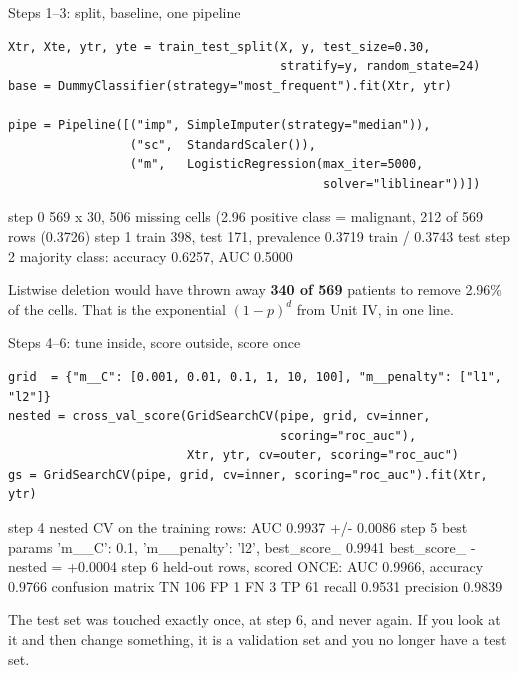 \documentclass[aspectratio=169]{beamer}
\begin{document}
\begin{frame}[fragile,shrink=4]{Steps 1--3: split, baseline, one pipeline}
\begin{lstlisting}
Xtr, Xte, ytr, yte = train_test_split(X, y, test_size=0.30,
                                      stratify=y, random_state=24)
base = DummyClassifier(strategy="most_frequent").fit(Xtr, ytr)

pipe = Pipeline([("imp", SimpleImputer(strategy="median")),
                 ("sc",  StandardScaler()),
                 ("m",   LogisticRegression(max_iter=5000,
                                            solver="liblinear"))])
\end{lstlisting}
\begin{outblk}
step 0  569 x 30, 506 missing cells (2.96%
        positive class = malignant, 212 of 569 rows (0.3726)
step 1  train 398, test 171, prevalence 0.3719 train / 0.3743 test
step 2  majority class: accuracy 0.6257, AUC 0.5000
\end{outblk}
  \begin{center}
    \small Listwise deletion would have thrown away \textbf{340 of 569}
    patients to remove 2.96\% of the cells. That is the exponential
    $(1-p)^d$ from Unit IV, in one line.
  \end{center}
\end{frame}

\begin{frame}[fragile,shrink=4]{Steps 4--6: tune inside, score outside, score once}
\begin{lstlisting}
grid  = {"m__C": [0.001, 0.01, 0.1, 1, 10, 100], "m__penalty": ["l1", "l2"]}
nested = cross_val_score(GridSearchCV(pipe, grid, cv=inner,
                                      scoring="roc_auc"),
                         Xtr, ytr, cv=outer, scoring="roc_auc")
gs = GridSearchCV(pipe, grid, cv=inner, scoring="roc_auc").fit(Xtr, ytr)
\end{lstlisting}
\begin{outblk}
step 4  nested CV on the training rows: AUC 0.9937 +/- 0.0086
step 5  best params {'m__C': 0.1, 'm__penalty': 'l2'}, best_score_ 0.9941
        best_score_ - nested = +0.0004
step 6  held-out rows, scored ONCE: AUC 0.9966, accuracy 0.9766
        confusion matrix  TN 106  FP 1  FN 3  TP 61
        recall 0.9531   precision 0.9839
\end{outblk}
  \begin{center}
    \small The test set was touched exactly once, at step 6, and never again.
    If you look at it and then change something, it is a validation set and
    you no longer have a test set.
  \end{center}
\end{frame}
\end{document}
